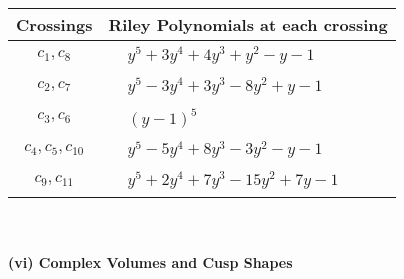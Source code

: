 \documentclass[1p]{elsarticle_modified}
\theoremstyle{definition}
\begin{document}
\begin{tabular}{m{50pt}|m{274pt}}
Crossings & \hspace{64pt}Riley Polynomials at each crossing \\
\hline $$\begin{aligned}c_{1},c_{8}\end{aligned}$$&$\begin{aligned}
&y^5+3 y^4+4 y^3+y^2- y-1
\end{aligned}$\\
\hline $$\begin{aligned}c_{2},c_{7}\end{aligned}$$&$\begin{aligned}
&y^5-3 y^4+3 y^3-8 y^2+y-1
\end{aligned}$\\
\hline $$\begin{aligned}c_{3},c_{6}\end{aligned}$$&$\begin{aligned}
&(y-1)^5
\end{aligned}$\\
\hline $$\begin{aligned}c_{4},c_{5},c_{10}\end{aligned}$$&$\begin{aligned}
&y^5-5 y^4+8 y^3-3 y^2- y-1
\end{aligned}$\\
\hline $$\begin{aligned}c_{9},c_{11}\end{aligned}$$&$\begin{aligned}
&y^5+2 y^4+7 y^3-15 y^2+7 y-1
\end{aligned}$\\
\hline
\end{tabular}\\~\\
\newpage\flushleft \textbf{(vi) Complex Volumes and Cusp Shapes}
\end{document}
